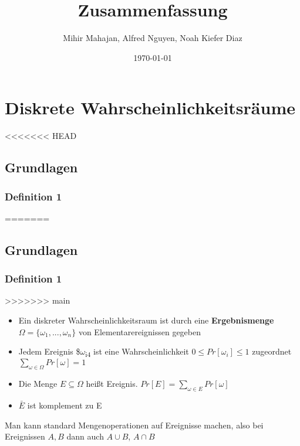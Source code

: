 \documentclass[11pt]{article}
\author{Mihir Mahajan, Alfred Nguyen, Noah Kiefer Diaz}
\date{\today}
\title{Zusammenfassung}
\begin{document}
\maketitle
\tableofcontents


\section{Diskrete Wahrscheinlichkeitsräume}
<<<<<<< HEAD
\label{sec:orgd338391}
\subsection{Grundlagen}
\label{sec:orge94c6d7}

\subsubsection{Definition 1}
\label{sec:orgeaa7da6}
=======
\label{sec:org977150b}
\subsection{Grundlagen}
\label{sec:orga74ad3e}

\subsubsection{Definition 1}
\label{sec:orge37f7dd}
>>>>>>> main
\begin{itemize}
\item Ein diskreter Wahrscheinlichkeitsraum ist durch eine \textbf{Ergebnismenge} \(\Omega = \{\omega_1,...,\omega_n\}\) von Elementarereignissen gegeben
\item Jedem Ereignis \$\(\omega\)\textsubscript{i4} ist eine Wahrscheinlichkeit \(0 \leq Pr[\omega_i] \leq 1\) zugeordnet \\
\(\sum_{\omega \in \Omega} Pr[\omega]= 1\)
\item Die Menge \(E \subseteq \Omega\) heißt Ereignis. \(Pr[E] = \sum_{\omega \in E} Pr[\omega]\)
\item \(\bar{E}\) ist komplement zu E
\end{itemize}


Man kann standard Mengenoperationen auf Ereignisse machen, also bei Ereignissen \(A,B\) dann auch \(A \cup B\), \(A \cap B\)
\end{document}
